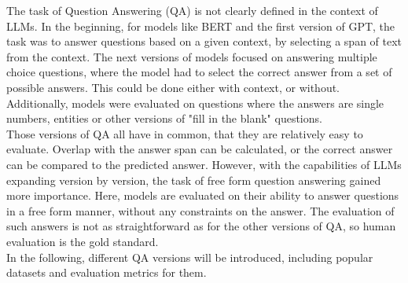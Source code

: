 The task of Question Answering (QA) is not clearly defined in the context of LLMs.
In the beginning, for models like BERT and the first version of GPT, the task was to answer questions based on a given context, by selecting a span of text from the context.
The next versions of models focused on answering multiple choice questions, where the model had to select the correct answer from a set of possible answers.
This could be done either with context, or without.
Additionally, models were evaluated on questions where the answers are single numbers, entities or other versions of "fill in the blank" questions.
\\
Those versions of QA all have in common, that they are relatively easy to evaluate.
Overlap with the answer span can be calculated, or the correct answer can be compared to the predicted answer.
However, with the capabilities of LLMs expanding version by version, the task of free form question answering gained more importance.
Here, models are evaluated on their ability to answer questions in a free form manner, without any constraints on the answer.
The evaluation of such answers is not as straightforward as for the other versions of QA, so human evaluation is the gold standard.
\\
In the following, different QA versions will be introduced, including popular datasets and evaluation metrics for them.

